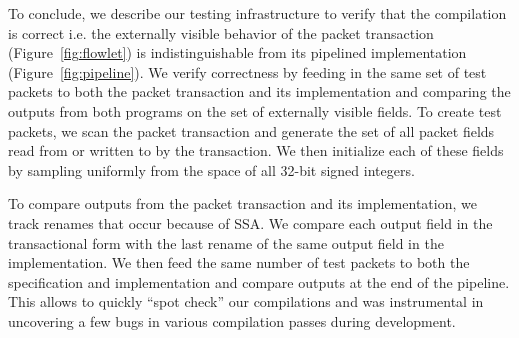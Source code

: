 To conclude, we describe our testing infrastructure to verify that the
compilation is correct i.e. the externally visible behavior of the packet
transaction (Figure~\ref{fig:flowlet}) is indistinguishable from its pipelined
implementation (Figure~\ref{fig:pipeline}). We verify correctness by feeding in
the same set of test packets to both the packet transaction and its
implementation and comparing the outputs from both programs on the set of
externally visible fields. To create test packets, we scan the packet
transaction and generate the set of all packet fields read from or written to
by the transaction. We then initialize each of these fields by sampling
uniformly from the space of all 32-bit signed integers.

To compare outputs from the packet transaction and its implementation, we track
renames that occur because of SSA. We compare each output field in the
transactional form with the last rename of the same output field in the
implementation. We then feed the same number of test packets to both the
specification and implementation and compare outputs at the end of the
pipeline. This allows to quickly ``spot check'' our compilations and was
instrumental in uncovering a few bugs in various compilation passes during
development.
